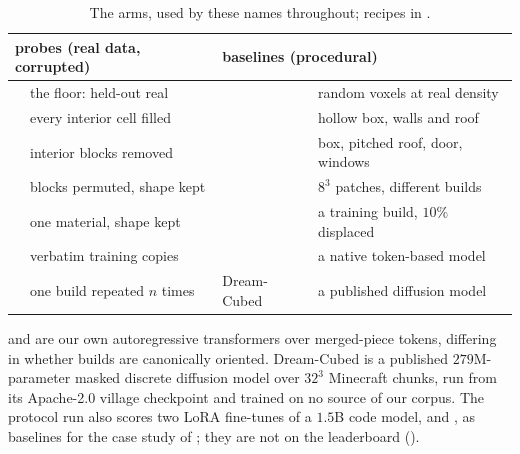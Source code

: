 \begin{table}[t]
\centering
\small
\caption{The arms, used by these names throughout; recipes in .}
\label{tab:arms}
\begin{tabular}{ll@{\hspace{1.2em}}ll}
\toprule
\multicolumn{2}{l}{\textbf{probes} (real data, corrupted)} & \multicolumn{2}{l}{\textbf{baselines} (procedural)} \\
\midrule
\realheld{}     & the floor: held-out real     & \randomvox{}   & random voxels at real density \\
\solidify{}     & every interior cell filled   & \hollowbox{}   & hollow box, walls and roof \\
\hollow{}       & interior blocks removed      & \gabled{}      & box, pitched roof, door, windows \\
\matshuffle{}   & blocks permuted, shape kept  & \patchstitch{} & $8^3$ patches, different builds \\
\monochrome{}   & one material, shape kept     & \copynoise{}   & a training build, $10\%$ displaced \\
\traincopy{}    & verbatim training copies     & \voxar{} & a native token-based model \\
\singlemode{}   & one build repeated $n$ times & Dream-Cubed & a published diffusion model \\
\bottomrule
\end{tabular}
\end{table}

\voxar{} and \voxarun{} are our own autoregressive transformers over merged-piece tokens,
differing in whether builds are canonically oriented. Dream-Cubed
\citep{merino2026dreamcubed} is a published $279$M-parameter masked discrete diffusion model
over $32^3$ Minecraft chunks, run from its Apache-2.0 village checkpoint and trained on no
source of our corpus. The protocol run also scores two LoRA fine-tunes of a $1.5$B code
model, \llmft{} and \llmgeo{}, as baselines for the case study of ;
they are not on the leaderboard ().

